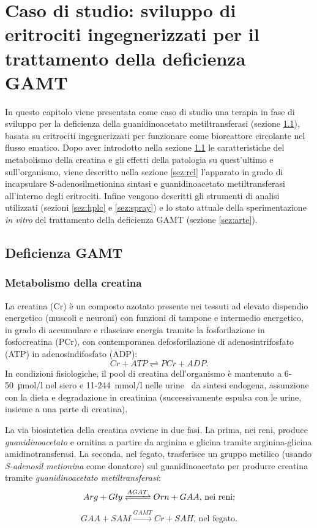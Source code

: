 \chapter{Caso di studio: sviluppo di eritrociti ingegnerizzati per il trattamento della deficienza GAMT}\label{cap:casostudio}
In questo capitolo viene presentata come caso di studio una terapia in fase di sviluppo per la deficienza della guanidinoacetato metiltransferasi (sezione \ref{sez:defgamt}), basata su eritrociti ingegnerizzati per funzionare come bioreattore circolante nel flusso ematico.
Dopo aver introdotto nella sezione \ref{sez:defgamt} le caratteristiche del metabolismo della creatina e gli effetti della patologia su quest'ultimo e sull'organismo, viene descritto nella sezione \ref{sez:rcl} l'apparato in grado di incapsulare S-adenosilmetionina sintasi e guanidinoacetato metiltransferasi all'interno degli eritrociti.
Infine vengono descritti gli strumenti di analisi utilizzati (sezioni \ref{sez:hplc} e \ref{sez:spray}) e lo stato attuale della sperimentazione \emph{in vitro} del trattamento della deficienza GAMT (sezione \ref{sez:arte}).

	\section{Deficienza GAMT}\label{sez:defgamt}
	
		\subsection{Metabolismo della creatina}
		La creatina (Cr) \`e un composto azotato presente nei tessuti ad elevato dispendio energetico (muscoli e neuroni) con funzioni di tampone e intermedio energetico, in grado di accumulare e rilasciare energia tramite la fosforilazione in fosfocreatina (PCr), con contemporanea defosforilazione di adenosintrifosfato (ATP) in adenosindifosfato (ADP):
		\begin{equation*}
			Cr + ATP \rightleftharpoons PCr + ADP.
		\end{equation*}
		In condizioni fisiologiche, il pool di creatina dell'organismo \`e mantenuto a 6-\SI{50}{\micro mol/l} nel siero e 11-\SI{244}{mmol/l} nelle urine~\cite{o2009guanidinoacetate} da sintesi endogena, assunzione con la dieta e degradazione in creatinina (successivamente espulsa con le urine, insieme a una parte di creatina).
		
		La via biosintetica della creatina avviene in due fasi.
		La prima, nei reni, produce \emph{guanidinoacetato} e ornitina a partire da arginina e glicina tramite arginina-glicina amidinotransferasi.
		La seconda, nel fegato, trasferisce un gruppo metilico (usando \emph{S-adenosil metionina} come donatore) sul guanidinoacetato per produrre creatina tramite \emph{guanidinoacetato metiltransferasi}:
		\begin{equation}
			Arg + Gly \xrightleftharpoons{AGAT} Orn + GAA\text{, nei reni;}\label{eq:agat}
		\end{equation}
		\begin{equation}
			GAA + SAM \xrightarrow{GAMT} Cr + SAH\text{, nel fegato.}\label{eq:gamt}
		\end{equation}
		
